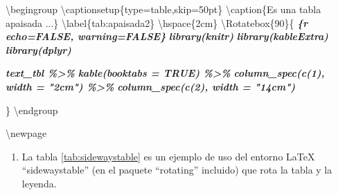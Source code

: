 \documentclass[12pt,a4paper,oneside,]{book}
\newenvironment{Shaded}{\begin{snugshade}}{\end{snugshade}}
\newcommand{\InformationTok}[1]{\textcolor[rgb]{0.56,0.35,0.01}{\textbf{\textit{#1}}}}
\newcommand{\NormalTok}[1]{#1}
\providecommand{\tightlist}{%
  \setlength{\itemsep}{0pt}\setlength{\parskip}{0pt}}
\numberwithin{dummy}{section}
\theoremstyle{ocrenumbox}
\theoremstyle{blacknumex}
\theoremstyle{blacknumbox}
\theoremstyle{ocrenum}
\theoremstyle{ocrenum}
\begin{document}
\begin{Shaded}
\begin{Highlighting}[]

\NormalTok{\textbackslash{}begingroup}
\NormalTok{\textbackslash{}captionsetup\{type=table,skip=50pt\}}
\NormalTok{\textbackslash{}caption\{Es una tabla apaisada ...\} \textbackslash{}label\{tab:apaisada2\}}
\NormalTok{\textbackslash{}hspace\{2cm\}}
\NormalTok{\textbackslash{}Rotatebox\{90\}\{}
\InformationTok{\textasciigrave{}\textasciigrave{}\textasciigrave{}\{r echo=FALSE, warning=FALSE\}}
\InformationTok{library(knitr)}
\InformationTok{library(kableExtra)}
\InformationTok{library(dplyr)}

\InformationTok{text\_tbl \%\textgreater{}\%}
\InformationTok{  kable(booktabs = TRUE) \%\textgreater{}\% }
\InformationTok{      column\_spec(c(1), width = "2cm") \%\textgreater{}\% }
\InformationTok{      column\_spec(c(2), width = "14cm")}

\InformationTok{\textasciigrave{}\textasciigrave{}\textasciigrave{}}
\NormalTok{\}}
\NormalTok{\textbackslash{}endgroup}

\NormalTok{\textbackslash{}newpage}
\end{Highlighting}
\end{Shaded}

\begin{enumerate}
\def\labelenumi{\arabic{enumi}.}
\setcounter{enumi}{2}
\tightlist
\item
  La tabla \ref{tab:sidewaystable} es un ejemplo de uso del entorno
  LaTeX ``sidewaystable'' (en el paquete ``rotating'' incluido) que rota
  la tabla y la leyenda.
\end{enumerate}
\end{document}
